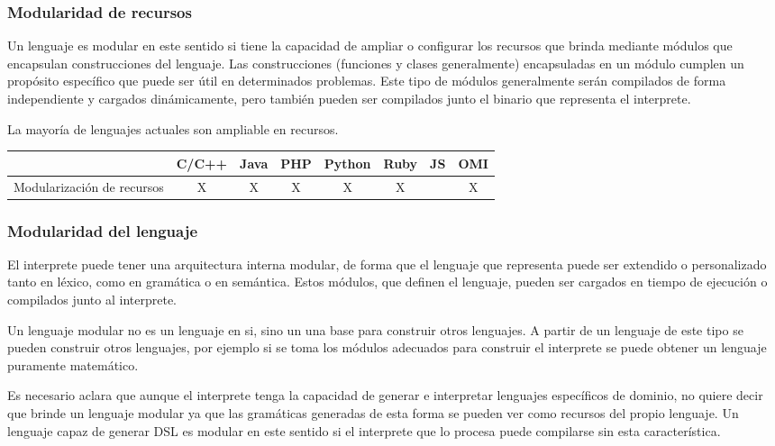 \subsubsection{Modularidad de recursos}
Un lenguaje es modular en este sentido si tiene la capacidad de ampliar o configurar los recursos que brinda mediante módulos 
que encapsulan construcciones del lenguaje. Las construcciones 
(funciones y clases generalmente) encapsuladas en un módulo cumplen un propósito específico
que puede ser útil en determinados problemas. Este tipo de módulos
generalmente serán compilados de forma independiente y cargados dinámicamente, pero 
también pueden ser compilados junto el binario que representa el interprete.

La mayoría de lenguajes actuales son ampliable en recursos. 

\FloatBarrier
\begin{table}[h]
\begin{center}
\begin{tabular}{|r|c|c|c|c|c|c|c|} \hline
 & C/C++ & Java & PHP  & Python & Ruby & JS & OMI\\ \hline
Modularización de recursos & X & X & X & X & X &   & X \\ \hline
\end{tabular}
\end{center}
\end{table}
\FloatBarrier

\subsubsection{Modularidad del lenguaje}
El interprete puede tener una arquitectura interna modular, de forma que el 
lenguaje que representa puede ser extendido o personalizado tanto 
en léxico, como en gramática o en semántica.  Estos módulos, que definen
el lenguaje, pueden ser cargados en tiempo de ejecución o compilados junto 
al interprete.

Un lenguaje modular no es un lenguaje en si, sino un una base para construir otros 
lenguajes. A partir de un lenguaje de este tipo se pueden construir otros lenguajes,
por ejemplo si se toma los módulos adecuados para construir el interprete
se puede obtener un lenguaje puramente matemático.

Es necesario aclara que aunque el interprete tenga la capacidad de generar e interpretar lenguajes
específicos de dominio, no quiere decir que brinde un lenguaje modular ya que las gramáticas
generadas de esta forma se pueden ver como recursos del propio lenguaje. Un lenguaje capaz de generar 
DSL es modular en este sentido si el interprete que lo procesa puede compilarse sin esta característica.

